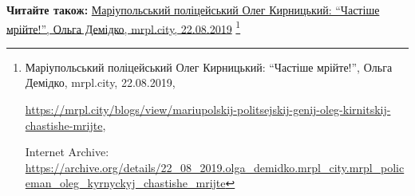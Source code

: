  
 
 
 
 

\def\pubIA{https://archive.org/details/22_08_2019.olga_demidko.mrpl_city.mrpl_policeman_oleg_kyrnyckyj_chastishe_mrijte}
\def\pubTitle{Маріупольський поліцейський Олег Кирницький: \enquote{Частіше мрійте!}}
\def\pubDate{22.08.2019}
\def\pubOrigin{https://mrpl.city/blogs/view/mariupolskij-politsejskij-genij-oleg-kirnitskij-chastishe-mrijte}
\def\pubAuthor{Ольга Демідко}

\textbf{Читайте також:} \href{\pubIA}{%
\pubTitle, \pubAuthor, mrpl.city, \pubDate}%
\footnote{\pubTitle, \pubAuthor, mrpl.city, \pubDate, \par\url{\pubOrigin}, \par Internet Archive: \url{\pubIA}}
